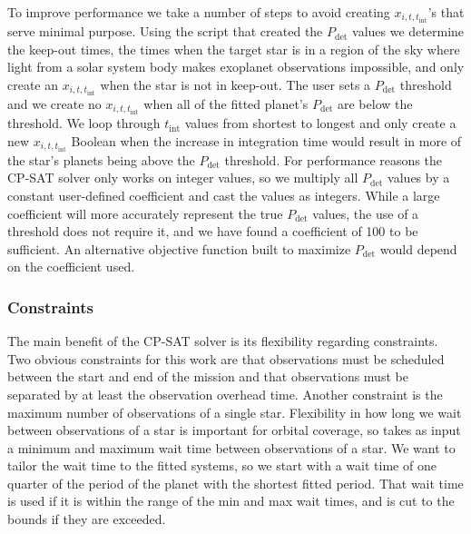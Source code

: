 To improve performance we take a number of steps to avoid creating $x_{i, t,
t_{\textrm{int}}}$'s that serve minimal purpose. Using the 
script that created the $P_{\textrm{det}}$ values we determine the keep-out
times, the times when the target star is in a region of the sky where light
from a solar system body makes exoplanet observations impossible, and only
create an $x_{i, t, t_{\textrm{int}}}$ when the star is not in keep-out. The
user sets a $P_{\textrm{det}}$ threshold and we create no $x_{i, t,
t_{\textrm{int}}}$ when all of the fitted planet's $P_{\textrm{det}}$ are below
the threshold. We loop through $t_{\textrm{int}}$ values from shortest to
longest and only create a new $x_{i, t, t_{\textrm{int}}}$ Boolean when the
increase in integration time would result in more of the star's planets being
above the $P_{\textrm{det}}$ threshold. For performance reasons the CP-SAT
solver only works on integer values, so we multiply all $P_{\textrm{det}}$
values by a constant user-defined coefficient and cast the values as integers.
While a large coefficient will more accurately represent the true
$P_{\textrm{det}}$ values, the use of a threshold does not require it, and we
have found a coefficient of 100 to be sufficient. An alternative objective
function built to maximize $P_{\textrm{det}}$ would depend on the coefficient
used.

\subsubsection{Constraints}

The main benefit of the CP-SAT solver is its flexibility regarding constraints.
Two obvious constraints for this work are that observations must be scheduled
between the start and end of the mission and that observations must be
separated by at least the observation overhead time. Another constraint is the
maximum number of observations of a single star. Flexibility in how long we
wait between observations of a star is important for orbital coverage, so
 takes as input a minimum and maximum wait time between observations
of a star. We want to tailor the wait time to the fitted systems, so we start
with a wait time of one quarter of the period of the planet with the shortest
fitted period. That wait time is used if it is within the range of the min and
max wait times, and is cut to the bounds if they are exceeded.


